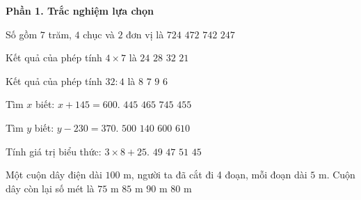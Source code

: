 \textbf{Phần 1. Trắc nghiệm lựa chọn}

\begin{ex} %
Số gồm $7$ trăm, $4$ chục và $2$ đơn vị là
\choice
{$724$}
{$472$}
{\True $742$}
{$247$}
\end{ex}

\begin{ex} %
Kết quả của phép tính $4 \times 7$ là
\choice
{$24$}
{\True $28$}
{$32$}
{$21$}
\end{ex}

\begin{ex} %
Kết quả của phép tính $32 : 4$ là
\choice
{\True $8$}
{$7$}
{$9$}
{$6$}
\end{ex}

\begin{ex} %
Tìm $x$ biết: $x + 145 = 600$.
\choice
{$445$}
{$465$}
{$745$}
{\True $455$}
\end{ex}

\begin{ex} %
Tìm $y$ biết: $y - 230 = 370$.
\choice
{$500$}
{$140$}
{\True $600$}
{$610$}
\end{ex}

\begin{ex} %
Tính giá trị biểu thức: $3 \times 8 + 25$.
\choice
{\True $49$}
{$47$}
{$51$}
{$45$}
\end{ex}

\begin{ex} %
Một cuộn dây điện dài $100\text{ m}$, người ta đã cắt đi 4 đoạn, mỗi đoạn dài $5\text{ m}$. Cuộn dây còn lại số mét là
\choice
{$75\text{ m}$}
{$85\text{ m}$}
{$90\text{ m}$}
{\True $80\text{ m}$}
\end{ex}

